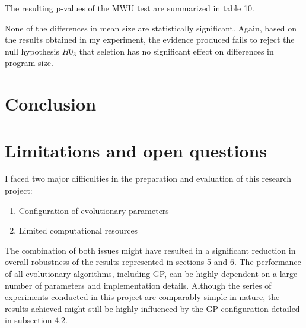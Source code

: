 \documentclass[
  12pt,
]{article}
\providecommand{\tightlist}{%
  \setlength{\itemsep}{0pt}\setlength{\parskip}{0pt}}
\begin{document}
The resulting p-values of the MWU test are summarized in table 10.

\begin{table}[!h]

\caption{\label{tab:unnamed-chunk-10}Mean Size - P-Values}
\centering
{}
\end{table}

None of the differences in mean size are statistically significant.
Again, based on the results obtained in my experiment, the evidence
produced fails to reject the null hypothesis \(H0_{3}\) that seletion
has no significant effect on differences in program size.

\hypertarget{conclusion}{%
\section{Conclusion}\label{conclusion}}

\hypertarget{limitations-and-open-questions}{%
\section{Limitations and open
questions}\label{limitations-and-open-questions}}

I faced two major difficulties in the preparation and evaluation of this
research project:

\begin{enumerate}
\def\labelenumi{\arabic{enumi}.}
\tightlist
\item
  Configuration of evolutionary parameters
\item
  Limited computational resources
\end{enumerate}

The combination of both issues might have resulted in a significant
reduction in overall robustness of the results represented in sections 5
and 6. The performance of all evolutionary algorithms, including GP, can
be highly dependent on a large number of parameters and implementation
details. Although the series of experiments conducted in this project
are comparably simple in nature, the results achieved might still be
highly influenced by the GP configuration detailed in subsection 4.2.
\end{document}
